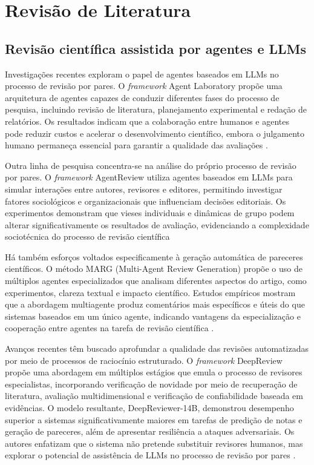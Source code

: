 


\chapter{Revisão de Literatura}\label{chap:levantamento_literatura}

\section{Revisão científica assistida por agentes e LLMs}

Investigações recentes exploram o papel de agentes baseados em LLMs no processo de revisão por pares. O \textit{framework} Agent Laboratory propõe uma arquitetura de agentes capazes de conduzir diferentes fases do processo de pesquisa, incluindo revisão de literatura, planejamento experimental e redação de relatórios. Os resultados indicam que a colaboração entre humanos e agentes pode reduzir custos e acelerar o desenvolvimento científico, embora o julgamento humano permaneça essencial para garantir a qualidade das avaliações \cite{AgentLaboratory}.

Outra linha de pesquisa concentra-se na análise do próprio processo de revisão por pares. O \textit{framework} AgentReview utiliza agentes baseados em LLMs para simular interações entre autores, revisores e editores, permitindo investigar fatores sociológicos e organizacionais que influenciam decisões editoriais. Os experimentos demonstram que vieses individuais e dinâmicas de grupo podem alterar significativamente os resultados de avaliação, evidenciando a complexidade sociotécnica do processo de revisão científica \cite{AgentReview}

Há também esforços voltados especificamente à geração automática de pareceres científicos. O método MARG (Multi-Agent Review Generation) propõe o uso de múltiplos agentes especializados que analisam diferentes aspectos do artigo, como experimentos, clareza textual e impacto científico. Estudos empíricos mostram que a abordagem multiagente produz comentários mais específicos e úteis do que sistemas baseados em um único agente, indicando vantagens da especialização e cooperação entre agentes na tarefa de revisão científica \cite{MARG}.

Avanços recentes têm buscado aprofundar a qualidade das revisões automatizadas por meio de processos de raciocínio estruturado. O \textit{framework} DeepReview propõe uma abordagem em múltiplos estágios que emula o processo de revisores especialistas, incorporando verificação de novidade por meio de recuperação de literatura, avaliação multidimensional e verificação de confiabilidade baseada em evidências. O modelo resultante, DeepReviewer-14B, demonstrou desempenho superior a sistemas significativamente maiores em tarefas de predição de notas e geração de pareceres, além de apresentar resiliência a ataques adversariais. Os autores enfatizam que o sistema não pretende substituir revisores humanos, mas explorar o potencial de assistência de LLMs no processo de revisão por pares \cite{DeepReview}. 

